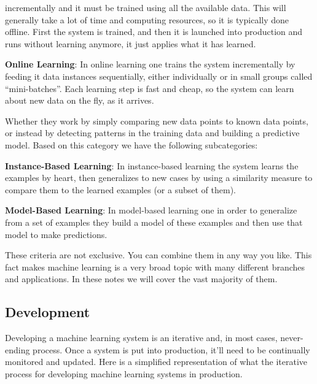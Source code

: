 incrementally and it must be trained using all the available data. This will generally take a lot of time and
computing resources, so it is typically done offline. First the system is trained, and then it is launched into
production and runs without learning anymore, it just applies what it has learned.
\item \textbf{Online Learning}: In online learning one trains the system incrementally by feeding it data instances
sequentially, either individually or in small groups called ``mini-batches''. Each learning step is fast and cheap, so
the system can learn about new data on the fly, as it arrives.
\eit
\item Whether they work by simply comparing new data points to known data
points, or instead by detecting patterns in the training data and building a predictive model. Based on this
category we have the following subcategories:
\bit
\item \textbf{Instance-Based Learning}: In instance-based learning the system learns the examples by heart, then
generalizes to new cases by using a similarity measure to compare them to the learned examples (or a subset of them).
\item \textbf{Model-Based Learning}: In model-based learning one in order to generalize from a set of examples they
build a model of these examples and then use that model to make predictions.
\eit
\een

These criteria are not exclusive. You can combine them in any way you like. This fact makes machine learning is a
very broad topic with many different branches and applications. In these notes we will cover the vast majority of them.

\subsection{Development}

Developing a machine learning system is an iterative and, in most cases, never-ending process. Once a system is put
into production, it'll need to be continually monitored and updated. Here is a simplified representation of what the
iterative process for developing machine learning systems in production.

